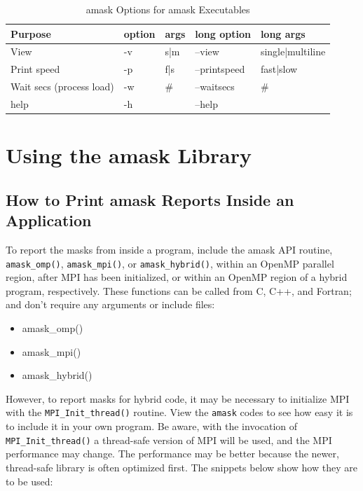 \documentclass[10pt,a4paper]{report}
\begin{document}
\begin{table}[ht]
\centering
\caption{amask Options for amask Executables}
\label{tab:amaskopts}
\begin{tabular}{|l|l|l|l|l|}
\hline
Purpose                  & option & args & long option  & long args        \\ \hline
View                     & -v     & s|m  & --view       & single|multiline \\ \hline
Print speed              & -p     & f|s  & --printspeed & fast|slow        \\ \hline
Wait secs (process load) & -w     & \#   & --waitsecs   & \#               \\ \hline
help                     & -h     &      & --help       &                  \\ \hline
\end{tabular}
\end{table}


\chapter{Using the amask Library}


\section{How to Print amask Reports Inside an Application}

To report the masks from inside a program, include the amask API routine, \verb+amask_omp()+,
\verb+amask_mpi()+, or \verb+amask_hybrid()+, within an OpenMP parallel region, after MPI has been
initialized, or within an OpenMP region of a hybrid program, respectively.  These functions can
be called from C, C++, and Fortran; and don't require any arguments or include files:  

\begin{itemize}
\item amask\_omp()
\item amask\_mpi()
\item amask\_hybrid()
\end{itemize}



However, to report masks for hybrid code, it may be necessary
to initialize MPI with the \verb+MPI_Init_thread()+ routine. View the \verb+amask+ codes to see how easy
it is to include it in your own program. Be aware, with the invocation of
\verb+MPI_Init_thread()+ a thread-safe version of MPI will be used, and the MPI performance
may change.  The performance may be better because the newer, thread-safe library is often
optimized first.  The snippets below show how they are to be used:
\end{document}
